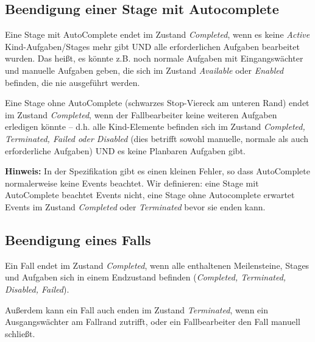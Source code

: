 \documentclass[12pt,report]{../../Templates/snetTeaching}
\begin{document}


\subsection{Beendigung einer Stage mit Autocomplete}

Eine Stage mit AutoComplete endet im Zustand \emph{Completed}, wenn es keine \emph{Active} Kind-Aufgaben/Stages mehr gibt UND alle erforderlichen Aufgaben bearbeitet wurden. Das heißt, es könnte z.B. noch normale Aufgaben mit Eingangswächter und manuelle Aufgaben geben, die sich im Zustand \emph{Available} oder \emph{Enabled} befinden, die nie ausgeführt werden.

Eine Stage ohne AutoComplete (schwarzes Stop-Viereck am unteren Rand) endet im Zustand \emph{Completed}, wenn der Fallbearbeiter keine weiteren Aufgaben erledigen könnte -- d.h. alle Kind-Elemente befinden sich im Zustand \emph{Completed, Terminated, Failed oder Disabled} (dies betrifft sowohl manuelle, normale als auch erforderliche Aufgaben) UND es keine Planbaren Aufgaben gibt.

\textbf{Hinweis:} In der Spezifikation gibt es einen kleinen Fehler, so dass AutoComplete normalerweise keine Events beachtet. Wir definieren: eine Stage mit AutoComplete beachtet Events nicht, eine Stage ohne Autocomplete erwartet Events im Zustand \emph{Completed} oder \emph{Terminated} bevor sie enden kann.



\subsection{Beendigung eines Falls}

Ein Fall endet im Zustand \emph{Completed}, wenn alle enthaltenen Meilensteine, Stages und Aufgaben  sich in einem Endzustand befinden (\emph{Completed, Terminated, Disabled, Failed}). 

Außerdem kann ein Fall auch enden im Zustand \emph{Terminated},  wenn ein Ausgangswächter am Fallrand zutrifft, oder ein Fallbearbeiter den Fall manuell schließt. 
\end{document}
